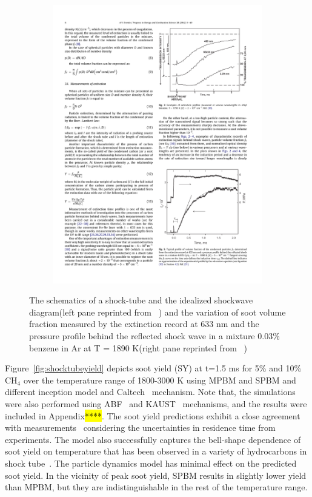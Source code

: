\begin{figure}[!htbp]
\begin{subfigure}[t]{0.4\textwidth}
	\includegraphics[width=1\textwidth]{Figures/Results/Shocktube/pfv_sample_shocktube.pdf}
	\end{subfigure}
	\caption{The schematics of a shock-tube and the idealized shockwave diagram(left pane reprinted from ~\citet{kee2017chemically}) and the variation of soot volume fraction measured by the extinction record at 633 nm and the pressure profile behind the reflected shock wave in a mixture 0.03\% benzene in Ar at T = 1890 K(right pane reprinted from ~\citet{karasevich1994soot})}
	\label{fig:shocktubeschem}
\end{figure}

Figure~\ref{fig:shocktubeyield} depicts soot yield (SY) at t=1.5 ms for 5\% and 10\% $\mathrm{CH_4}$ over the temperature range of 1800-3000 K using MPBM and SPBM and different inception model and Caltech~\citep{blanquart2009chemical} mechanism. Note that, the simulations were also performed using ABF~\citep{appel2000kinetic} and KAUST~\cite{wang2013pah} mechanisms, and the results were included in Appendix\hl{****}. The soot yield predictions exhibit a close agreement with measurements~\citep{agafonov2016unified} considering the uncertainties in residence time from experiments. The model also successfully captures the bell-shape dependence of soot yield on temperature that has been observed in a variety of hydrocarbons in shock tube~\citep{kellerer1996soot,knorre1996soot}. The particle dynamics model has minimal effect on the predicted soot yield. In the vicinity of peak soot yield, SPBM results in slightly lower yield than MPBM, but they are indistinguishable in the rest of the temperature range. 

